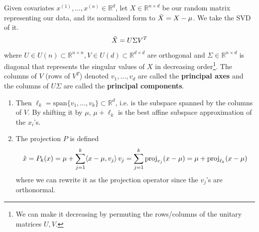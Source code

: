     \begin{theorem} 
      Given covariates $x^{(1)}, \ldots, x^{(n)} \in \mathbb{R}^{d}$, let $X \in \mathbb{R}^{n \times d}$ be our random matrix representing our data, and its normalized form to $\Tilde{X} = X - \mu$. We take the SVD of it. 
      \begin{equation}
        \Tilde{X} = U \Sigma V^T
      \end{equation}
      where $U \in U(n) \subset \mathbb{R}^{n \times n}, V \in U(d) \subset \mathbb{R}^{d \times d}$ are orthogonal and $\Sigma \in \mathbb{R}^{n \times d}$ is diagonal that represents the singular values of $X$ in decreasing order\footnote{We can make it decreasing by permuting the rows/columns of the unitary matrices $U, V$.}. The columns of $V$ (rows of $V^T$) denoted $v_1, \ldots, v_d$ are called the \textbf{principal axes} and the columns of $U\Sigma$ are called the \textbf{principal components}. 
      \begin{enumerate}
        \item Then $\ell_k = \mathrm{span}\{v_1, \ldots, v_k\} \subset \mathbb{R}^d$, i.e. is the subspace spanned by the columns of $V$. By shifting it by $\mu$, $\mu + \ell_k$ is the best affine subspace approximation of the $x_i$'s. 

        \item The projection $P$ is defined 
        \begin{equation}
          \hat{x} = P_k (x) = \mu + \sum_{j=1}^k \langle x - \mu, v_j \rangle \, v_j = \sum_{j=1}^k \operatorname{proj}_{v_j} (x - \mu) = \mu + \operatorname{proj}_{\ell_k} (x - \mu)
        \end{equation}
        where we can rewrite it as the projection operator since the $v_j$'s are orthonormal. 


\end{enumerate}
\end{theorem}
